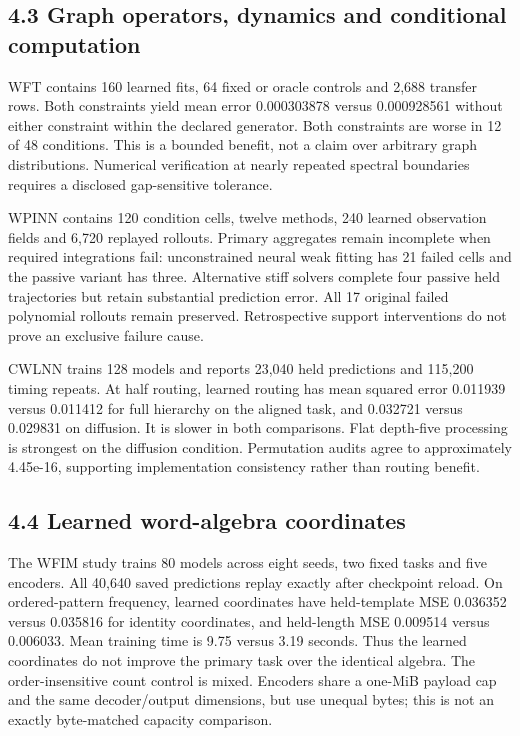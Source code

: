 \documentclass[
]{article}
\begin{document}
\subsection{4.3 Graph operators, dynamics and conditional
computation}\label{graph-operators-dynamics-and-conditional-computation}

WFT contains 160 learned fits, 64 fixed or oracle controls and 2,688
transfer rows. Both constraints yield mean error 0.000303878 versus
0.000928561 without either constraint within the declared generator.
Both constraints are worse in 12 of 48 conditions. This is a bounded
benefit, not a claim over arbitrary graph distributions. Numerical
verification at nearly repeated spectral boundaries requires a disclosed
gap-sensitive tolerance.

WPINN contains 120 condition cells, twelve methods, 240 learned
observation fields and 6,720 replayed rollouts. Primary aggregates
remain incomplete when required integrations fail: unconstrained neural
weak fitting has 21 failed cells and the passive variant has three.
Alternative stiff solvers complete four passive held trajectories but
retain substantial prediction error. All 17 original failed polynomial
rollouts remain preserved. Retrospective support interventions do not
prove an exclusive failure cause.

CWLNN trains 128 models and reports 23,040 held predictions and 115,200
timing repeats. At half routing, learned routing has mean squared error
0.011939 versus 0.011412 for full hierarchy on the aligned task, and
0.032721 versus 0.029831 on diffusion. It is slower in both comparisons.
Flat depth-five processing is strongest on the diffusion condition.
Permutation audits agree to approximately 4.45e-16, supporting
implementation consistency rather than routing benefit.

\subsection{4.4 Learned word-algebra
coordinates}\label{learned-word-algebra-coordinates}

The WFIM study trains 80 models across eight seeds, two fixed tasks and
five encoders. All 40,640 saved predictions replay exactly after
checkpoint reload. On ordered-pattern frequency, learned coordinates
have held-template MSE 0.036352 versus 0.035816 for identity
coordinates, and held-length MSE 0.009514 versus 0.006033. Mean training
time is 9.75 versus 3.19 seconds. Thus the learned coordinates do not
improve the primary task over the identical algebra. The
order-insensitive count control is mixed. Encoders share a one-MiB
payload cap and the same decoder/output dimensions, but use unequal
bytes; this is not an exactly byte-matched capacity comparison.
\end{document}
